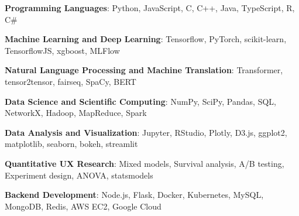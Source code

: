 
\textbf{Programming Languages}: Python, JavaScript, C, C++, Java, TypeScript, R, C\# %

\textbf{Machine Learning and Deep Learning}: Tensorflow, PyTorch, scikit-learn, TensorflowJS, xgboost, MLFlow %

\textbf{Natural Language Processing and Machine Translation}: Transformer, tensor2tensor, fairseq, SpaCy, BERT %


\textbf{Data Science and Scientific Computing}: NumPy, SciPy, Pandas, SQL, NetworkX, Hadoop, MapReduce, Spark %

\textbf{Data Analysis and Visualization}: Jupyter, RStudio, Plotly, D3.js, ggplot2, matplotlib, seaborn, bokeh, streamlit %

\textbf{Quantitative UX Research}: Mixed models, Survival analysis, A/B testing, Experiment design, ANOVA, statsmodels %





\textbf{Backend Development}: Node.js, Flask, Docker, Kubernetes, MySQL, MongoDB, Redis, AWS EC2, Google Cloud %


